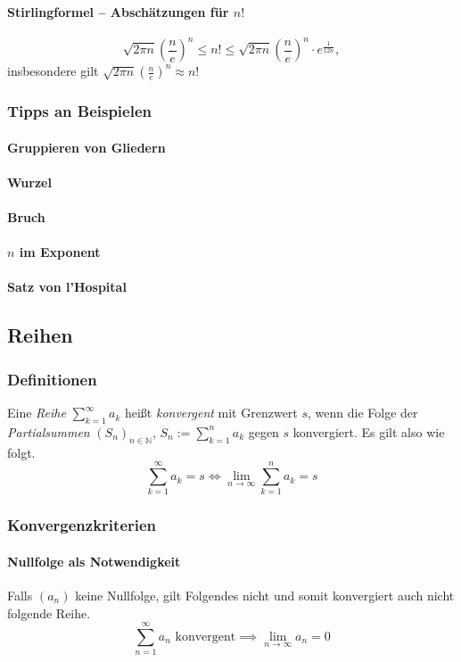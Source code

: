 \documentclass[a4paper, 9pt, DIV=24]{scrartcl}
\newcommand{\N}{\mathbb{N}}
\begin{document}
\paragraph{Stirlingformel -- Abschätzungen für $n!$}
\[\sqrt{2\pi n}(\frac{n}{e})^n \leq n! \leq \sqrt{2\pi n}(\frac{n}{e})^n \cdot e^{\frac{1}{12n}}, \] insbesondere gilt 
$\sqrt{2\pi n}(\frac{n}{e})^n \approx n!$

\subsubsection{Tipps an Beispielen}
\paragraph{Gruppieren von Gliedern}
\paragraph{Wurzel}
\paragraph{Bruch}
\paragraph{$n$ im Exponent}
\paragraph{Satz von l'Hospital}

\subsection{Reihen}
\subsubsection{Definitionen}
Eine \emph{Reihe} $\sum_{k = 1}^\infty a_k$ heißt \emph{konvergent} mit Grenzwert $s$, wenn die Folge der \emph{Partialsummen}
$(S_n)_{n \in \N}$, $S_n := \sum_{k=1}^n a_k$ gegen $s$ konvergiert. Es gilt also wie folgt.
\[ \sum_{k=1}^\infty a_k = s \iff \lim_{n\rightarrow\infty} \sum_{k=1}^n a_k = s \]

\subsubsection{Konvergenzkriterien}

\paragraph{Nullfolge als Notwendigkeit}
Falls $(a_n)$ keine Nullfolge, gilt Folgendes nicht und somit konvergiert auch nicht folgende Reihe.
\[ \sum_{n=1}^\infty a_n \text{ konvergent} \implies \lim_{n \to \infty} a_n = 0 \]
\end{document}
